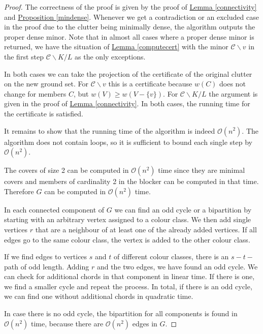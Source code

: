 \documentclass[a4paper, 12pt]{scrbook}
\theoremstyle{definition}
\begin{document}
   \begin{proof}
       The correctness of the proof is given by the proof of \hyperref[connectivity]{Lemma \ref*{connectivity}} and \hyperref[mindense]{Proposition \ref*{mindense}}.
       Whenever we get a contradiction or an excluded case in the proof due to the clutter being minimally dense, the algorithm outputs the proper dense minor.
       Note that in almost all cases where a proper dense minor is returned, we have the situation of \hyperref[computecert]{Lemma \ref*{computecert}} with the minor $\mathcal{C}\backslash v$ in the first step $\mathcal{C} \backslash K / L$ as the only exceptions.

       In both cases we can take the projection of the certificate of the original clutter on the new ground set.
       For $\mathcal{C} \backslash v$ this is a certificate because $w(C)$ does not change for members $C$, but $w(V) \geq w(V-\{v\})$.
       For $\mathcal{C} \backslash K / L$ the argument is given in the proof of \hyperref[connectivity]{Lemma \ref*{connectivity}}.
       In both cases, the running time for the certificate is satisfied.

       It remains to show that the running time of the algorithm is indeed $\mathcal{O}(n^2)$.
       The algorithm does not contain loops, so it is sufficient to bound each single step by $\mathcal{O}(n^2)$.

       The covers of size 2 can be computed in $\mathcal{O}(n^2)$ time since they are minimal covers and members of cardinality 2 in the blocker can be computed in that time.
       Therefore $G$ can be computed in $\mathcal{O}(n^2)$ time.

       In each connected component of $G$ we can find an odd cycle or a bipartition by starting with an arbitrary vertex assigned to a colour class. We then add single vertices $r$ that are a neighbour of at least one of the already added vertices. If all edges go to the same colour class, the vertex is added to the other colour class.

       If we find edges to vertices $s$ and $t$ of different colour classes, there is an $s-t-$path of odd length. Adding $r$ and the two edges, we have found an odd cycle. We can check for additional chords in that component in linear time. If there is one, we find a smaller cycle and repeat the process. In total, if there is an odd cycle, we can find one without additional chords in quadratic time.

       In case there is no odd cycle, the bipartition for all components is found in $\mathcal{O}(n^2)$ time, because there are $\mathcal{O}(n^2)$ edges in $G$.


\end{proof}
\end{document}
